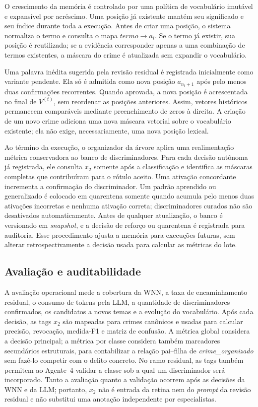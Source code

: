 O crescimento da memória é controlado por uma política de vocabulário imutável e expansível por acréscimo. Uma posição já existente mantém seu significado e seu índice durante toda a execução. Antes de criar uma posição, o sistema normaliza o termo e consulta o mapa $\textit{termo}\rightarrow a_i$. Se o termo já existir, sua posição é reutilizada; se a evidência corresponder apenas a uma combinação de termos existentes, a máscara do crime é atualizada sem expandir o vocabulário.

Uma palavra inédita sugerida pela revisão residual é registrada inicialmente como variante pendente. Ela só é admitida como nova posição $a_{n_t+1}$ após pelo menos duas confirmações recorrentes. Quando aprovada, a nova posição é acrescentada no final de $V^{(t)}$, sem reordenar as posições anteriores. Assim, vetores históricos permanecem comparáveis mediante preenchimento de zeros à direita. A criação de um novo crime adiciona uma nova máscara vetorial sobre o vocabulário existente; ela não exige, necessariamente, uma nova posição lexical.

Ao término da execução, o organizador da árvore aplica uma realimentação métrica conservadora ao banco de discriminadores. Para cada decisão autônoma já registrada, ele consulta $x_2$ somente após a classificação e identifica as máscaras completas que contribuíram para o rótulo aceito. Uma ativação concordante incrementa a confirmação do discriminador. Um padrão aprendido ou generalizado é colocado em quarentena somente quando acumula pelo menos duas ativações incorretas e nenhuma ativação correta; discriminadores curados não são desativados automaticamente. Antes de qualquer atualização, o banco é versionado em \textit{snapshot}, e a decisão de reforço ou quarentena é registrada para auditoria. Esse procedimento ajusta a memória para execuções futuras, sem alterar retrospectivamente a decisão usada para calcular as métricas do lote.

\subsection{Avaliação e auditabilidade}

A avaliação operacional mede a cobertura da WNN, a taxa de encaminhamento residual, o consumo de tokens pela LLM, a quantidade de discriminadores confirmados, os candidatos a novos temas e a evolução do vocabulário. Após cada decisão, as tags $x_2$ são mapeadas para crimes canônicos e usadas para calcular precisão, revocação, medida-F1 e matriz de confusão. A métrica global considera a decisão principal; a métrica por classe considera também marcadores secundários estruturais, para contabilizar a relação pai--filha de \textit{crime\_organizado} sem fazê-lo competir com o delito concreto. No ramo residual, as tags também permitem ao Agente~4 validar a classe sob a qual um discriminador será incorporado. Tanto a avaliação quanto a validação ocorrem após as decisões da WNN e da LLM; portanto, $x_2$ não é entrada da retina nem do \textit{prompt} da revisão residual e não substitui uma anotação independente por especialistas.

